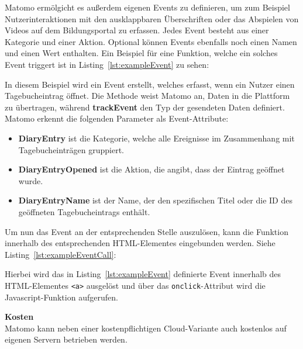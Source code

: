 Matomo ermölgicht es außerdem eigenen Events zu definieren, um zum Beispiel Nutzerinteraktionen mit den ausklappbaren Überschriften oder das Abspielen von Videos auf dem Bildungsportal zu erfassen. Jedes Event besteht aus einer Kategorie und einer Aktion. Optional können Events ebenfalls noch einen Namen und einen Wert enthalten. Ein Beispiel für eine Funktion, welche ein solches Event triggert ist in Listing~\ref{lst:exampleEvent} zu sehen: 

\FloatBarrier


In diesem Beispiel wird ein Event erstellt, welches erfasst, wenn ein Nutzer einen Tagebucheintrag öffnet. Die Methode \texttt{} weist Matomo an, Daten in die Plattform zu übertragen, während \textbf{trackEvent} den Typ der gesendeten Daten definiert. Matomo erkennt die folgenden Parameter als Event-Attribute:

\begin{itemize}
    \item \textbf{DiaryEntry} ist die Kategorie, welche alle Ereignisse im Zusammenhang mit Tagebucheinträgen gruppiert.
    \item \textbf{DiaryEntryOpened} ist die Aktion, die angibt, dass der Eintrag geöffnet wurde.
    \item \textbf{DiaryEntryName} ist der Name, der den spezifischen Titel oder die ID des geöffneten Tagebucheintrags enthält.
\end{itemize}

Um nun das Event an der entsprechenden Stelle auszulösen, kann die Funktion innerhalb des entsprechenden HTML-Elementes eingebunden werden. Siehe Listing~\ref{lst:exampleEventCall}: 

\FloatBarrier
\begin{minipage}{\linewidth}

\end{minipage}

Hierbei wird das in Listing~\ref{lst:exampleEvent} definierte Event innerhalb des HTML-Elementes \texttt{<a>} ausgelöst und über das \texttt{onclick}-Attribut wird die Javascript-Funktion aufgerufen.

\textbf{Kosten} \\
Matomo kann neben einer kostenpflichtigen Cloud-Variante auch kostenlos auf eigenen Servern betrieben werden. 

